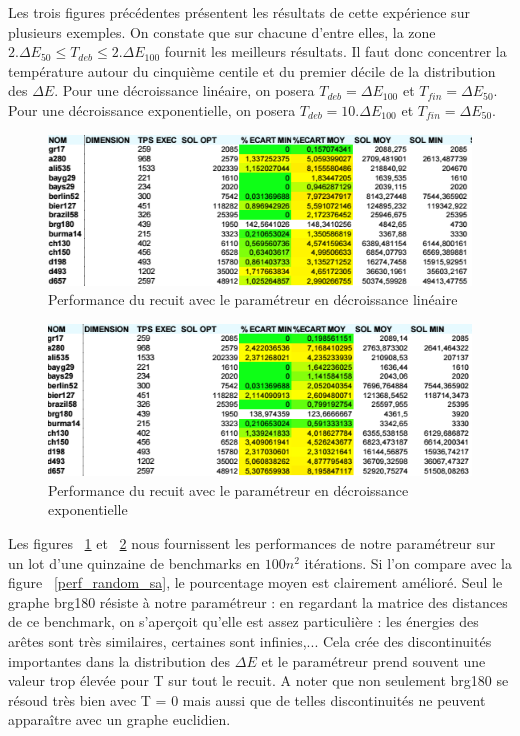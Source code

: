 \documentclass{article}%
\begin{document}
		Les trois figures précédentes présentent les résultats de cette expérience sur plusieurs exemples. On constate que sur chacune d'entre elles, la zone $ 2. \Delta E_{50} \leq T_{deb} \leq 2. \Delta E_{100} $ fournit les meilleurs résultats. Il faut donc concentrer la température autour du cinquième centile et du premier décile de la distribution des $ \Delta E $.
		Pour une décroissance linéaire, on posera $ T_{deb} = \Delta E_{100} $ et $ T_{fin} = \Delta E_{50} $. 
		Pour une décroissance exponentielle, on posera $ T_{deb} = 10.\Delta E_{100} $ et $ T_{fin} = \Delta E_{50} $.
		
	\begin{figure}[!h]
	\begin{center}
	\includegraphics[scale=0.4]{perf_lin.png}
	\caption{Performance du recuit avec le paramétreur en décroissance linéaire}
	\label{perf_lin}
	\end{center}
	\end{figure}
	
	\begin{figure}[!h]
	\begin{center}
	\includegraphics[scale=0.4]{perf_exp.png}
	\caption{Performance du recuit avec le paramétreur en décroissance exponentielle}
	\label{perf_exp}
	\end{center}
	\end{figure}
	
	Les figures ~\ref{perf_lin} et ~\ref{perf_exp} nous fournissent les performances de notre paramétreur sur un lot d'une quinzaine de benchmarks en $100n^2 $ itérations. Si l'on compare avec la figure ~\ref{perf_random_sa}, le pourcentage moyen est clairement amélioré. Seul le graphe brg180 résiste à notre paramétreur : en regardant la matrice des distances de ce benchmark, on s'aperçoit qu'elle est assez particulière : les énergies des arêtes sont très similaires, certaines sont infinies,... Cela crée des discontinuités importantes dans la distribution des $ \Delta E $ et le paramétreur prend souvent une valeur trop élevée pour T sur tout le recuit. A noter que non seulement brg180 se résoud très bien avec T = 0 mais aussi que de telles discontinuités ne peuvent apparaître avec un graphe euclidien.
	
\end{document}

